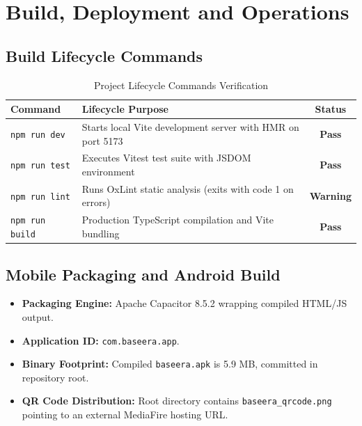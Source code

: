 \documentclass[10pt,a4paper]{report}
\newcommand{\statusPass}{\textcolor{passGreen}{\textbf{Pass}}}
\newcommand{\statusWarn}{\textcolor{warnOrange}{\textbf{Warning}}}
\begin{document}
\chapter{Build, Deployment and Operations}

\section{Build Lifecycle Commands}

\begin{table}[htbp]
\centering
\small
\caption{Project Lifecycle Commands Verification}
\begin{tabularx}{\textwidth}{l X c}
\toprule
\textbf{Command} & \textbf{Lifecycle Purpose} & \textbf{Status} \\
\midrule
\texttt{npm run dev} & Starts local Vite development server with HMR on port 5173 & \statusPass \\
\texttt{npm run test} & Executes Vitest test suite with JSDOM environment & \statusPass \\
\texttt{npm run lint} & Runs OxLint static analysis (exits with code 1 on errors) & \statusWarn \\
\texttt{npm run build} & Production TypeScript compilation and Vite bundling & \statusPass \\
\bottomrule
\end{tabularx}
\end{table}

\section{Mobile Packaging and Android Build}
\begin{itemize}[leftmargin=1.5em]
    \item \textbf{Packaging Engine:} Apache Capacitor 8.5.2 wrapping compiled HTML/JS output.
    \item \textbf{Application ID:} \texttt{com.baseera.app}.
    \item \textbf{Binary Footprint:} Compiled \texttt{baseera.apk} is 5.9 MB, committed in repository root.
    \item \textbf{QR Code Distribution:} Root directory contains \texttt{baseera\_qrcode.png} pointing to an external MediaFire hosting URL.
\end{itemize}
\end{document}
